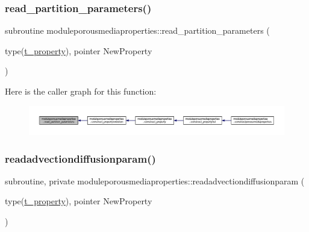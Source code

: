 \mbox{\label{namespacemoduleporousmediaproperties_a2b4f624f18ff4621d00ca5923d59cc36}} 
\subsubsection{\texorpdfstring{read\+\_\+partition\+\_\+parameters()}{read\_partition\_parameters()}}
{\footnotesize\ttfamily subroutine moduleporousmediaproperties\+::read\+\_\+partition\+\_\+parameters (\begin{DoxyParamCaption}\item[{type(\mbox{\hyperlink{structmoduleporousmediaproperties_1_1t__property}{t\+\_\+property}}), pointer}]{New\+Property }\end{DoxyParamCaption})\hspace{0.3cm}{\ttfamily [private]}}

Here is the caller graph for this function\+:\nopagebreak
\begin{figure}[H]
\begin{center}
\leavevmode
\includegraphics[width=350pt]{namespacemoduleporousmediaproperties_a2b4f624f18ff4621d00ca5923d59cc36_icgraph}
\end{center}
\end{figure}
\mbox{\label{namespacemoduleporousmediaproperties_af16278987bb08e48f63b916cf573a68d}} 
\subsubsection{\texorpdfstring{readadvectiondiffusionparam()}{readadvectiondiffusionparam()}}
{\footnotesize\ttfamily subroutine, private moduleporousmediaproperties\+::readadvectiondiffusionparam (\begin{DoxyParamCaption}\item[{type(\mbox{\hyperlink{structmoduleporousmediaproperties_1_1t__property}{t\+\_\+property}}), pointer}]{New\+Property }\end{DoxyParamCaption})\hspace{0.3cm}{\ttfamily [private]}}

